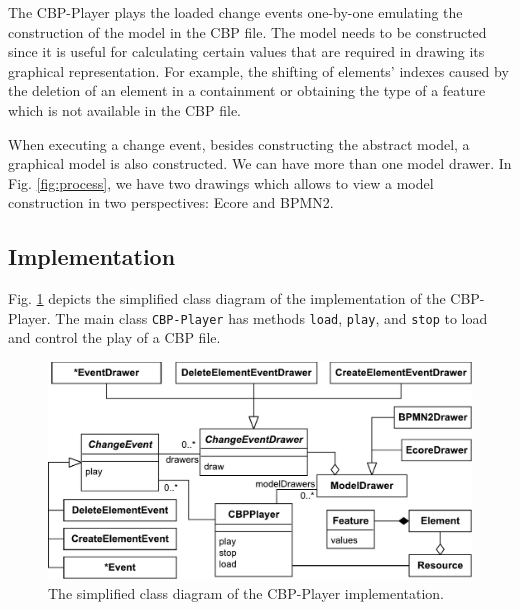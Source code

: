 \documentclass[conference]{IEEEtran}
\begin{document}
The CBP-Player plays the loaded change events one-by-one emulating the construction of the model in the CBP file.
The model needs to be constructed since it is useful for calculating certain values 
that are required in drawing its graphical representation.
For example, the shifting of elements' indexes caused by the deletion of an element in a containment or 
obtaining the type of a feature which is not available in the CBP file. 

When executing a change event, besides constructing the abstract model, 
a graphical model is also constructed. We can have more than one model drawer. 
In Fig. \ref{fig:process}, we have two drawings 
which allows to view a model construction in two perspectives: Ecore and BPMN2.

\subsection{Implementation}
\label{sec:implementation}
Fig. \ref{fig:class_diagram} depicts the simplified class diagram 
of the implementation of the CBP-Player. The main class \texttt{CBP-Player} has methods \texttt{load},
\texttt{play}, and \texttt{stop} to load and control the play of a CBP file.

\begin{figure}[h]
    \includegraphics[width=\linewidth]{class_diagram}
    \caption{The simplified class diagram of the CBP-Player implementation.}
    \label{fig:class_diagram}
\end{figure}
\end{document}
